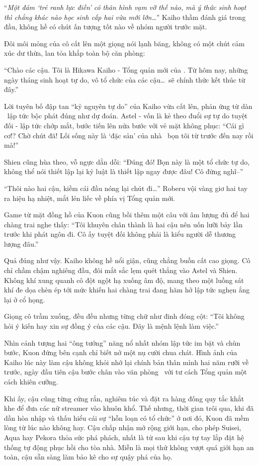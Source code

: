 \documentclass[../main.tex]{subfiles}
\begin{document}
``\textit{Một đám `trẻ ranh lực điền' có thân hình vạm vỡ thế nào, mà ý thức sinh hoạt thì chẳng khác nào học sinh cấp hai vừa mới lớn\dots}'' Kaiho thầm đánh giá trong đầu, không hề có chút ấn tượng tốt nào về nhóm người trước mặt.

Đôi môi mỏng của cô cất lên một giọng nói lạnh băng, không có một chút cảm xúc dư thừa, lan tỏa khắp toàn bộ căn phòng:

``Chào các cậu. Tôi là Hikawa Kaiho - Tổng quản mới của \hls. Từ hôm nay, những ngày tháng sinh hoạt tự do, vô tổ chức của các cậu\dots\ sẽ chính thức kết thúc từ đây.''

Lời tuyên bố đập tan ``kỷ nguyên tự do'' của Kaiho vừa cất lên, phản ứng từ dàn \hls\ lập tức bộc phát đúng như dự đoán. Astel - vốn là kẻ theo đuổi sự tự do tuyệt đối - lập tức chớp mắt, bước tiến lên nửa bước với vẻ mặt không phục: ``Cái gì cơ!? Chờ chút đã! Lối sống này là `đặc sản' của nhà \hls\ bọn tôi từ trước đến nay rồi mà!''

Shien cũng hùa theo, vỗ ngực dằn dỗi: ``Đúng đó! Bọn này là một tổ chức tự do, không thể nói thiết lập lại kỷ luật là thiết lập ngay được đâu! Cô đừng nghĩ--''

``Thôi nào hai cậu, kiềm cái đầu nóng lại chút đi\dots'' Roberu vội vàng giơ hai tay ra hiệu hạ nhiệt, mắt lén liếc về phía vị Tổng quản mới.

Game từ mặt đồng hồ của Kuon cũng bồi thêm một câu với âm lượng đủ để hai chàng trai nghe thấy: ``Tôi khuyên chân thành là hai cậu nên uốn lưỡi bảy lần trước khi phát ngôn đi. Cô ấy tuyệt đối không phải là kiểu người dễ thương lượng đâu.''

Quả đúng như vậy. Kaiho không hề nổi giận, cũng chẳng buồn cất cao giọng. Cô chỉ chầm chậm nghiêng đầu, đôi mắt sắc lẹm quét thẳng vào Astel và Shien. Không khí xung quanh cô đột ngột hạ xuống âm độ, mang theo một luồng sát khí đe dọa chèn ép tới mức khiến hai chàng trai đang hăm hở lập tức nghẹn ắng lại ở cổ họng.

Giọng cô trầm xuống, đều đều nhưng từng chữ như đinh đóng cột: ``Tôi không hỏi ý kiến hay xin sự đồng ý của các cậu. Đây là mệnh lệnh làm việc.''

Nhìn cảnh tượng hai ``ông tướng'' năng nổ nhất nhóm lập tức im bặt và chùn bước, Kuon đứng bên cạnh chỉ biết nở một nụ cười chua chát. Hình ảnh của Kaiho lúc này làm cậu không khỏi nhớ lại chính bản thân mình hai năm rưỡi về trước, ngày đầu tiên cậu bước chân vào văn phòng \hll\ với tư cách Tổng quản một cách khiên cưỡng.

Khi ấy, cậu cũng từng cứng rắn, nghiêm túc và đặt ra hàng đống quy tắc khắt khe để đưa các nữ streamer vào khuôn khổ. Thế nhưng, thời gian trôi qua, khi đã dần hòa nhập và thấu hiểu cái sự ``hỗn loạn có tổ chức'' ở nơi đó, Kuon đã mềm lòng từ lúc nào không hay. Cậu chấp nhận mở rộng giới hạn, cho phép Suisei, Aqua hay Pekora thỏa sức phá phách, nhất là từ sau khi cậu tự tay lắp đặt hệ thống tự động phục hồi cho tòa nhà. Miễn là mọi thứ không vượt quá giới hạn an toàn, cậu sẵn sàng làm bảo kê cho sự quậy phá của họ.
\end{document}
